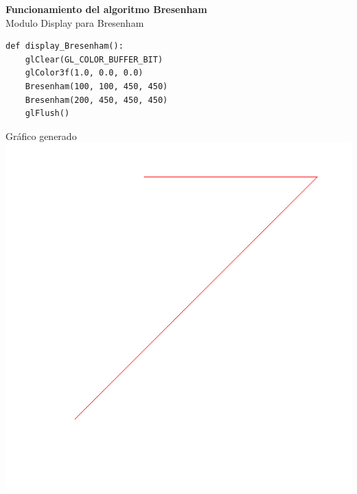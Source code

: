 \documentclass[a4paper]{article}
\begin{document}
\Large{\textbf{Funcionamiento del algoritmo Bresenham}}\\[0.5cm]
Modulo Display para Bresenham
\begin{center}
\begin{mycodebox}
\begin{lstlisting}
def display_Bresenham():
    glClear(GL_COLOR_BUFFER_BIT)
    glColor3f(1.0, 0.0, 0.0)
    Bresenham(100, 100, 450, 450)
    Bresenham(200, 450, 450, 450)
    glFlush()
\end{lstlisting}
\end{mycodebox}
\end{center}
Gráfico generado\\
\includegraphics[width=15cm]{src/bresenham.png}
\newpage
\end{document}
